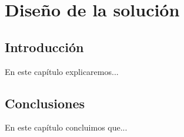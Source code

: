 \chapter{Diseño de la solución}\label{cap:diseño}

\section{Introducción}
En este capítulo explicaremos...

\section{Conclusiones}
En este capítulo concluimos que...